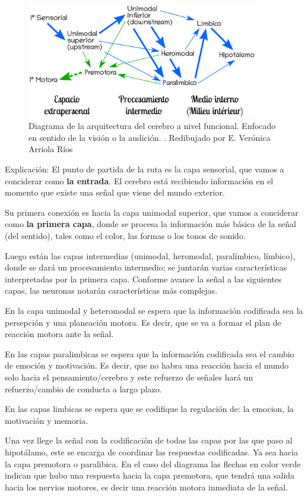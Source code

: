  \begin{figure}[h]
  \centering
  \includegraphics[width=0.9\textwidth]{../Figuras/zonasFuncionales.png}
  \caption{Diagrama de la arquitectura del cerebro a nivel funcional. Enfocado en sentido de la visión o la audición. \parencite{Mesulam1998}. Redibujado por E. Verónica Arriola Ríos}
  \label{fig:zonasFun}
 \end{figure}

Explicación: El punto de partida de la ruta es la capa sensorial, que vamos a conciderar como \textbf{la entrada}. El cerebro está recibiendo información en el momento que existe una señal que viene del mundo exterior.

Su primera conexión es hacia la capa unimodal superior, que vamos a conciderar como \textbf{la primera capa}, donde se procesa la información más básica de la señal (del sentido), tales como el color, las formas o los tonos de sonido.

Luego están las capas intermedias (unimodal, heromodal, paralímbico, límbico), donde se dará un procesamiento intermedio; se juntarán varias características interpretadas por la primera capa. Conforme avance la señal a las siguientes capas, las neuronas notarán características más complejas. 

En la capa unimodal y heteromodal se espera que la información codificada sea la persepción y una planeación motora. Es decir, que se va a formar el plan de reacción motora ante la señal. 

En las capas paralimbicas se espera que la información codificada sea el cambio de emoción y motivación. Es decir, que no habra una reacción hacia el mundo solo hacia el pensamiento/cerebro y este refuerzo de señales hará un refuerzo/cambio de conducta a largo plazo.

En las capas limbicas se espera que se codifique la regulación de: la emocion, la motivación y memoria.

Una vez llege la señal con la codificación de todas las capas por las que paso al hipotálamo, este se encarga de coordinar las respuestas codificadas. Ya sea hacia la capa premotora o paralibica. En el caso del diagrama las flechas en color verde indican que hubo una respuesta hacia la capa premotora, que tendrá una salida hacia los nervios motores, es decir una reacción motora inmediata de la señal. 


